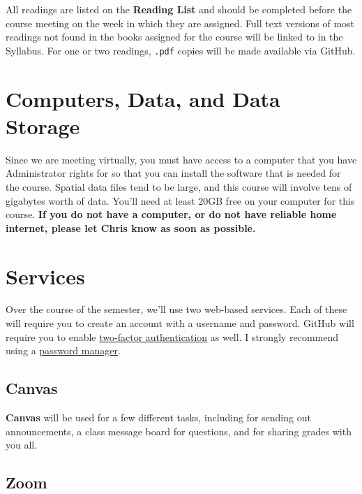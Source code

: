 \documentclass[
]{book}
\begin{document}
All readings are listed on the \textbf{Reading List} and should be completed before the course meeting on the week in which they are assigned. Full text versions of most readings not found in the books assigned for the course will be linked to in the Syllabus. For one or two readings, \texttt{.pdf} copies will be made available via GitHub.

\hypertarget{computers-data-and-data-storage}{%
\section{Computers, Data, and Data Storage}\label{computers-data-and-data-storage}}

Since we are meeting virtually, you must have access to a computer that you have Administrator rights for so that you can install the software that is needed for the course. Spatial data files tend to be large, and this course will involve tens of gigabytes worth of data. You'll need at least 20GB free on your computer for this course. \textbf{If you do not have a computer, or do not have reliable home internet, please let Chris know as soon as possible.}

\hypertarget{services}{%
\section{Services}\label{services}}

Over the course of the semester, we'll use two web-based services. Each of these will require you to create an account with a username and password. GitHub will require you to enable \href{https://en.wikipedia.org/wiki/Multi-factor_authentication}{two-factor authentication} as well. I strongly recommend using a \href{https://lifehacker.com/5529133/five-best-password-managers}{password manager}.

\hypertarget{canvas}{%
\subsection{Canvas}\label{canvas}}

\textbf{Canvas} will be used for a few different tasks, including for sending out announcements, a class message board for questions, and for sharing grades with you all.

\hypertarget{zoom}{%
\subsection{Zoom}\label{zoom}}
\end{document}
